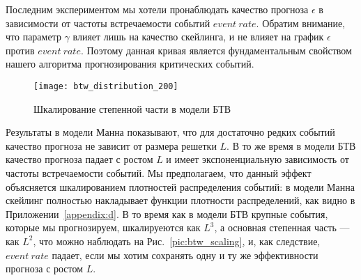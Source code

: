 Последним экспериментом мы хотели пронаблюдать качество прогноза $\epsilon$ в зависимости от частоты встречаемости событий $event\ rate$. Обратим внимание, что параметр $\gamma$ влияет лишь на качество скейлинга, и не влияет на график $\epsilon$ против $event\ rate$. Поэтому данная кривая является фундаментальным свойством нашего алгоритма прогнозирования критических событий.

\begin{figure}[h]
	\centering
	\texttt{[image: btw\_distribution\_200]}
	\caption{Шкалирование степенной части в модели БТВ}\label{pic:btw_scaling}
\end{figure}

Результаты в модели Манна показывают, что для достаточно редких событий качество прогноза не зависит от размера решетки $L$. В то же время в модели БТВ качество прогноза падает с ростом $L$ и имеет экспоненциальную зависимость от частоты встречаемости событий. Мы предполагаем, что данный эффект объясняется шкалированием плотностей распределения событий: в модели Манна скейлинг полностью накладывает функции плотности распределений, как видно в Приложении~\eqref{appendix:d}. В то время как в модели БТВ крупные события, которые мы прогнозируем, шкалируеются как $L^3$, а основная степенная часть --- как $L^2$, что можно наблюдать на Рис.~\eqref{pic:btw_scaling}, и, как следствие, $event\ rate$ падает, если мы хотим сохранять одну и ту же эффективности прогноза с ростом $L$.
